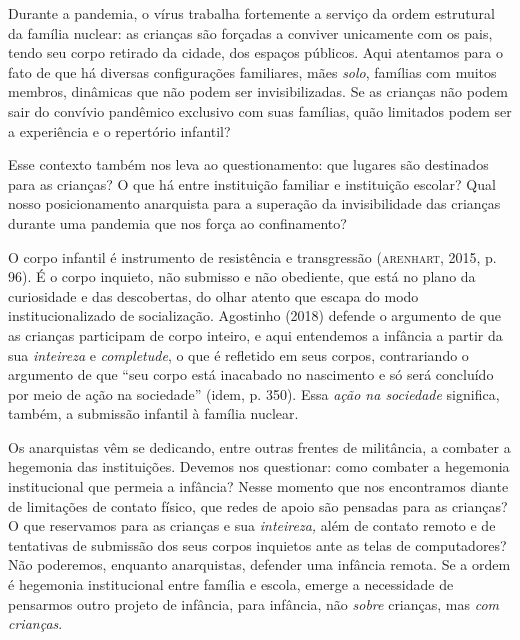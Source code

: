 Durante a pandemia, o vírus trabalha fortemente a serviço da ordem
estrutural da família nuclear: as crianças são forçadas a conviver
unicamente com os pais, tendo seu corpo retirado da cidade, dos espaços
públicos. Aqui atentamos para o fato de que há diversas configurações
familiares, mães \emph{solo}, famílias com muitos membros, dinâmicas que
não podem ser invisibilizadas. Se as crianças não podem sair do convívio
pandêmico exclusivo com suas famílias, quão limitados podem ser a
experiência e o repertório infantil?

Esse contexto também nos leva ao questionamento: que lugares são
destinados para as crianças? O que há entre instituição familiar e
instituição escolar? Qual nosso posicionamento anarquista para a
superação da invisibilidade das crianças durante uma pandemia que nos
força ao confinamento?

O corpo infantil é instrumento de resistência e transgressão (\textsc{arenhart},
2015, p. 96). É o corpo inquieto, não submisso e não obediente, que está
no plano da curiosidade e das descobertas, do olhar atento que escapa do
modo institucionalizado de socialização. Agostinho (2018) defende o
argumento de que as crianças participam de corpo inteiro, e aqui
entendemos a infância a partir da sua \emph{inteireza} e
\emph{completude}, o que é refletido em seus corpos, contrariando o
argumento de que ``seu corpo está inacabado no nascimento e só será
concluído por meio de ação na sociedade'' (idem, p. 350). Essa
\emph{ação na sociedade} significa, também, a submissão infantil à
família nuclear.

Os anarquistas vêm se dedicando, entre outras frentes de militância, a
combater a hegemonia das instituições. Devemos nos questionar: como
combater a hegemonia institucional que permeia a infância? Nesse momento
que nos encontramos diante de limitações de contato físico, que redes de
apoio são pensadas para as crianças? O que reservamos para as crianças e
sua \emph{inteireza,} além de contato remoto e de tentativas de
submissão dos seus corpos inquietos ante as telas de computadores? Não
poderemos, enquanto anarquistas, defender uma infância remota. Se a
ordem é hegemonia institucional entre família e escola, emerge a
necessidade de pensarmos outro projeto de infância, para infância, não
\emph{sobre} crianças, mas \emph{com crianças}.

